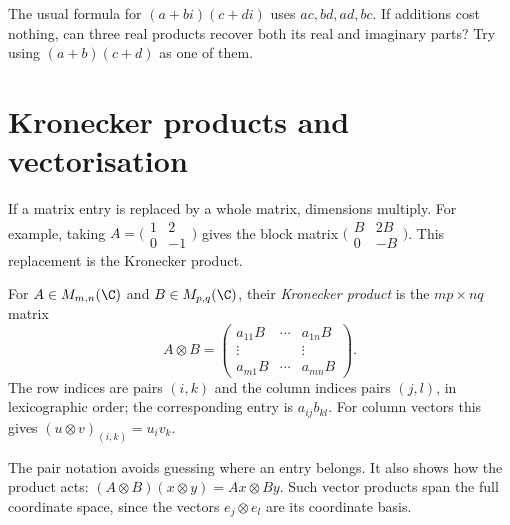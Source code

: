 \begin{think}
The usual formula for $(a+bi)(c+di)$ uses $ac,bd,ad,bc$. If additions cost nothing, can three real products recover both its real and imaginary parts? Try using $(a+b)(c+d)$ as one of them.
\end{think}

\section{Kronecker products and vectorisation}

If a matrix entry is replaced by a whole matrix, dimensions multiply. For example, taking
$A=\bigl(\begin{smallmatrix}1&2\\0&-1\end{smallmatrix}\bigr)$ gives the block matrix
$\bigl(\begin{smallmatrix}B&2B\\0&-B\end{smallmatrix}\bigr)$. This replacement is the Kronecker product.

\begin{definition}\label{linear:def:kronecker}
For $A\in M_{m,n}(\C)$ and $B\in M_{p,q}(\C)$, their \emph{Kronecker product} is the $mp\times nq$ matrix
\[
A\otimes B=
\begin{pmatrix}a_{11}B&\cdots&a_{1n}B\\\vdots&&\vdots\\a_{m1}B&\cdots&a_{mn}B\end{pmatrix}.
\]
The row indices are pairs $(i,k)$ and the column indices pairs $(j,l)$, in lexicographic order; the corresponding entry is $a_{ij}b_{kl}$. For column vectors this gives $(u\otimes v)_{(i,k)}=u_iv_k$.
\end{definition}

The pair notation avoids guessing where an entry belongs. It also shows how the product acts:
$(A\otimes B)(x\otimes y)=Ax\otimes By$. Such vector products span the full coordinate space, since the vectors $e_j\otimes e_l$ are its coordinate basis.

